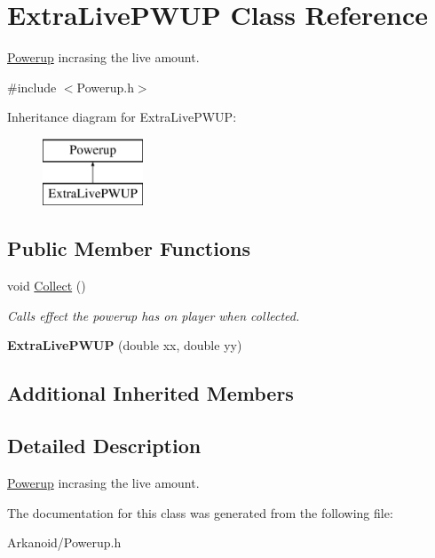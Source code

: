 \hypertarget{class_extra_live_p_w_u_p}{}\section{Extra\+Live\+P\+W\+UP Class Reference}
\label{class_extra_live_p_w_u_p}


\hyperlink{class_powerup}{Powerup} incrasing the live amount.  




{\ttfamily \#include $<$Powerup.\+h$>$}

Inheritance diagram for Extra\+Live\+P\+W\+UP\+:\begin{figure}[H]
\begin{center}
\leavevmode
\includegraphics[height=2.000000cm]{class_extra_live_p_w_u_p}
\end{center}
\end{figure}
\subsection*{Public Member Functions}
\begin{DoxyCompactItemize}
\item 
\mbox{\label{class_extra_live_p_w_u_p_add3e2d84928abe015534dbc8768158c8}} 
void \hyperlink{class_extra_live_p_w_u_p_add3e2d84928abe015534dbc8768158c8}{Collect} ()
\begin{DoxyCompactList}\small\item\em Calls effect the powerup has on player when collected. \end{DoxyCompactList}\item 
\mbox{\label{class_extra_live_p_w_u_p_ac3f06611f79a518dd883c255e81a979b}} 
{\bfseries Extra\+Live\+P\+W\+UP} (double xx, double yy)
\end{DoxyCompactItemize}
\subsection*{Additional Inherited Members}


\subsection{Detailed Description}
\hyperlink{class_powerup}{Powerup} incrasing the live amount. 

The documentation for this class was generated from the following file\+:\begin{DoxyCompactItemize}
\item 
Arkanoid/Powerup.\+h\end{DoxyCompactItemize}
